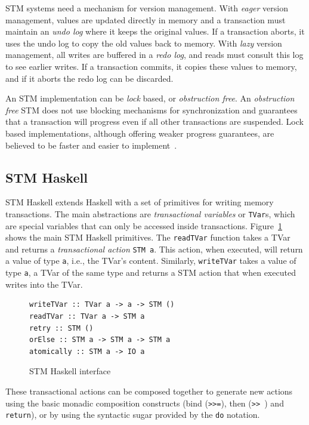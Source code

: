 \documentclass{llncs}
\begin{document}
STM systems need a mechanism for version management. With {\it eager} version management, values are updated
directly in memory and a transaction must maintain an {\it undo log} where it keeps the original values. If a transaction
aborts, it uses the undo log to copy the old values back to memory. With {\it lazy} version management, all
writes are buffered in a {\it redo log}, and reads must consult this log to see earlier writes. If a transaction commits,
it copies these values to memory, and if it aborts the redo log can be discarded.

An STM implementation can be {\it lock} based, or {\it obstruction free}. An {\it obstruction free} STM does
not use blocking mechanisms for synchronization and guarantees that a transaction will progress even if all
other transactions are suspended.
Lock based implementations, although offering weaker progress guarantees, are believed to be faster and easier
to implement~\cite{ennals}.

\subsection{STM Haskell}

STM Haskell extends Haskell with a set of primitives for writing memory
transactions\cite{stmhaskell}. The main abstractions are {\it transactional variables} or
{\tt TVar}s, which are special variables that can only be accessed inside transactions.
Figure~\ref{fig:stmhaskell} shows the main STM Haskell primitives. The {\tt readTVar} function takes
a TVar and returns a {\it transactional action} {\tt STM a}. This action, when executed,
will return a value of type {\tt a}, i.e., the TVar's content. Similarly, {\tt writeTVar} takes a value of type {\tt a},
a TVar of the same type and returns a STM action that when executed writes into the TVar.


\begin{figure}[!ht]
{\small\begin{verbatim}
writeTVar :: TVar a -> a -> STM ()
readTVar :: TVar a -> STM a
retry :: STM ()
orElse :: STM a -> STM a -> STM a
atomically :: STM a -> IO a
\end{verbatim}}

\vspace{-2mm}
\caption{STM Haskell interface}
\label{fig:stmhaskell}
\end{figure}

These transactional actions can be composed together to generate new actions using the basic monadic
composition constructs (bind ({\tt >>=}), then ({\tt >> }) and {\tt return}),
 or by using the syntactic sugar provided by the {\tt do} notation.
\end{document}
